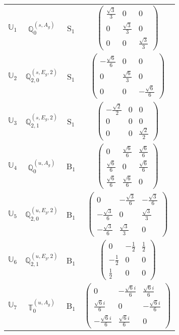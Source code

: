 \documentclass[fleqn,10pt,landscape]{article}
\begin{document}
\begin{itemize}
\begin{center}
\begin{longtable}{c|c|c|c}
$ \mathbb{U}_{1} $ & $\mathbb{Q}_{0}^{(s,A_{g})}$ & S$_{1}$ & $\begin{pmatrix} \frac{\sqrt{3}}{3} & 0 & 0 \\ 0 & \frac{\sqrt{3}}{3} & 0 \\ 0 & 0 & \frac{\sqrt{3}}{3} \end{pmatrix}$ \\
$ \mathbb{U}_{2} $ & $\mathbb{Q}_{2,0}^{(s,E_{g},2)}$ & S$_{1}$ & $\begin{pmatrix} - \frac{\sqrt{6}}{6} & 0 & 0 \\ 0 & \frac{\sqrt{6}}{3} & 0 \\ 0 & 0 & - \frac{\sqrt{6}}{6} \end{pmatrix}$ \\
$ \mathbb{U}_{3} $ & $\mathbb{Q}_{2,1}^{(s,E_{g},2)}$ & S$_{1}$ & $\begin{pmatrix} - \frac{\sqrt{2}}{2} & 0 & 0 \\ 0 & 0 & 0 \\ 0 & 0 & \frac{\sqrt{2}}{2} \end{pmatrix}$ \\ \hline
$ \mathbb{U}_{4} $ & $\mathbb{Q}_{0}^{(u,A_{g})}$ & B$_{1}$ & $\begin{pmatrix} 0 & \frac{\sqrt{6}}{6} & \frac{\sqrt{6}}{6} \\ \frac{\sqrt{6}}{6} & 0 & \frac{\sqrt{6}}{6} \\ \frac{\sqrt{6}}{6} & \frac{\sqrt{6}}{6} & 0 \end{pmatrix}$ \\
$ \mathbb{U}_{5} $ & $\mathbb{Q}_{2,0}^{(u,E_{g},2)}$ & B$_{1}$ & $\begin{pmatrix} 0 & - \frac{\sqrt{3}}{6} & - \frac{\sqrt{3}}{6} \\ - \frac{\sqrt{3}}{6} & 0 & \frac{\sqrt{3}}{3} \\ - \frac{\sqrt{3}}{6} & \frac{\sqrt{3}}{3} & 0 \end{pmatrix}$ \\
$ \mathbb{U}_{6} $ & $\mathbb{Q}_{2,1}^{(u,E_{g},2)}$ & B$_{1}$ & $\begin{pmatrix} 0 & - \frac{1}{2} & \frac{1}{2} \\ - \frac{1}{2} & 0 & 0 \\ \frac{1}{2} & 0 & 0 \end{pmatrix}$ \\
$ \mathbb{U}_{7} $ & $\mathbb{T}_{0}^{(u,A_{g})}$ & B$_{1}$ & $\begin{pmatrix} 0 & - \frac{\sqrt{6} i}{6} & \frac{\sqrt{6} i}{6} \\ \frac{\sqrt{6} i}{6} & 0 & - \frac{\sqrt{6} i}{6} \\ - \frac{\sqrt{6} i}{6} & \frac{\sqrt{6} i}{6} & 0 \end{pmatrix}$ \\

\end{longtable}
\end{center}
\end{itemize}
\end{document}
